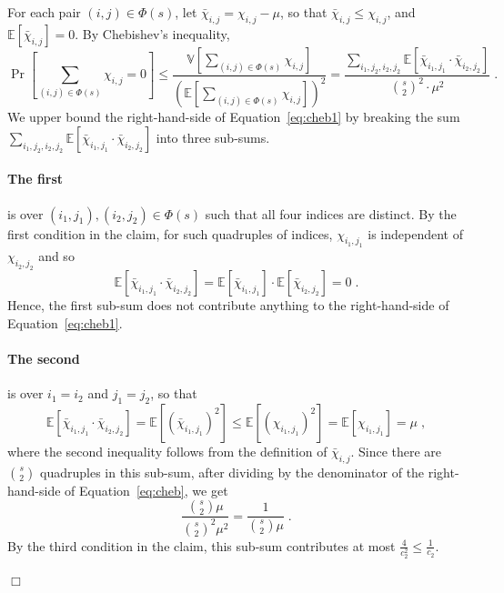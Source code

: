 \documentclass{article}
\newcommand{\Ex}{\mathbb{E}}
\newcommand{\Var}{\mathbb{V}}
\newenvironment{proof}{\smallskip\noindent{\bf Proof:}}%
        {\hspace*{\fill}$\Box$\par}
\begin{document}
\begin{proof}
For each pair $(i,j)\in \Phi(s)$,
let $\bar{\chi}_{i,j} = \chi_{i,j} - \mu$, so that $\bar{\chi}_{i,j} \leq \chi_{i,j}$, and
$\Ex[\bar{\chi}_{i,j}] = 0$.
By Chebishev's inequality,
\begin{equation}\label{eq:cheb1}
\Pr\left[\sum_{(i,j)\in \Phi(s)}\chi_{i,j}=0\right] \leq \frac{\Var\left[\sum_{(i,j)\in \Phi(s)} \chi_{i,j}\right]}{\left(\Ex\left[\sum_{(i,j)\in \Phi(s)}\chi_{i,j}\right]\right)^2}
= \frac{\sum_{i_1,j_2,i_2,j_2} \Ex[\bar{\chi}_{i_1,j_1}\cdot \bar{\chi}_{i_2,j_2}]}{{s\choose 2}^2\cdot \mu^2} \;.
\end{equation}
We upper bound the right-hand-side of Equation~\eqref{eq:cheb1} by breaking
 the sum $\sum_{i_1,j_2,i_2,j_2} \Ex[\bar{\chi}_{i_1,j_1}\cdot \bar{\chi}_{i_2,j_2}]$ into three sub-sums.

\paragraph{The first} is over $(i_1,j_1), (i_2,j_2)\in \Phi(s)$ such that all four indices are distinct. By the first condition in the claim, for such quadruples of indices, $\chi_{i_1,j_1}$ is independent of $\chi_{i_2,j_2}$ and so
\begin{equation}\label{eq:cheb-case1}
\Ex[\bar{\chi}_{i_1,j_1}\cdot \bar{\chi}_{i_2,j_2}] =  \Ex[\bar{\chi}_{i_1,j_1}]\cdot \Ex[\bar{\chi}_{i_2,j_2}] = 0\;.
\end{equation}
Hence, the first sub-sum does not contribute anything to the right-hand-side of Equation~\eqref{eq:cheb1}.

\paragraph{The second} is over $i_1 = i_2$ and $j_1 = j_2$, so that
\begin{equation}\label{eq:cheb-case2}
\Ex[\bar{\chi}_{i_1,j_1}\cdot \bar{\chi}_{i_2,j_2}] = \Ex[(\bar{\chi}_{i_1,j_1})^2]
\leq \Ex[(\chi_{i_1,j_1})^2] = \Ex[\chi_{i_1,j_1}] = \mu \;,
\end{equation}
where the second inequality follows from the definition of $\bar{\chi}_{i,j}$.
Since there are ${s\choose 2}$ quadruples in this sub-sum, after dividing by the denominator of the right-hand-side of Equation~\eqref{eq:cheb}, we get
\begin{equation}
\frac{{s\choose 2}\mu}{{s\choose 2}^2\mu^2} = \frac{1}{{s\choose 2} \mu}\;.
\end{equation}
By %
the third condition in the claim,
this sub-sum contributes at most $\frac{4}{c_2^2}\leq \frac{1}{c_2}$.


\end{proof}
\end{document}
